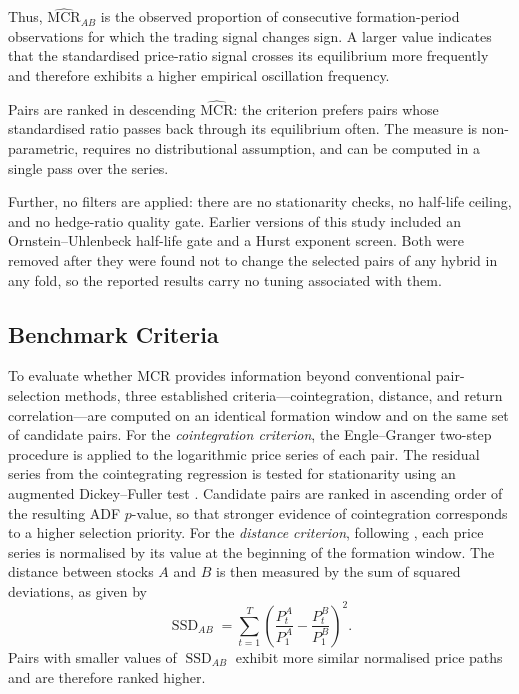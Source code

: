 \documentclass[11pt,a4paper]{article}
\theoremstyle{definition}
\newcommand{\MCR}{\ensuremath{\mathrm{MCR}}}
\begin{document}
Thus, $\widehat{\mathrm{MCR}}_{AB}$ is the observed proportion of
consecutive formation-period observations for which the trading signal
changes sign. A larger value indicates that the standardised price-ratio
signal crosses its equilibrium more frequently and therefore exhibits a
higher empirical oscillation frequency.


Pairs are ranked in descending $\widehat{\MCR}$: the criterion prefers pairs
whose standardised ratio passes back through its equilibrium often. The measure
is non-parametric, requires no distributional assumption, and can be computed in a single pass over the series.

Further, no filters are applied: there are no stationarity checks, no half-life
ceiling, and no hedge-ratio quality gate. Earlier versions of this study included
an Ornstein--Uhlenbeck half-life gate and a Hurst exponent screen. Both were
removed after they were found not to change the selected pairs of any hybrid in
any fold, so the reported results carry no tuning associated with them.

\subsection{Benchmark Criteria}

To evaluate whether MCR provides information beyond conventional pair-selection methods, three established criteria---cointegration, distance, and return correlation---are computed on an identical formation window and on the same set of candidate pairs. For the \emph{cointegration criterion}, the Engle--Granger two-step procedure \citep{engle1987, vidyamurthy2004} is applied to the logarithmic price series of each pair. The residual series from the cointegrating regression is tested for stationarity using an augmented Dickey--Fuller test \citep{dickey1979}. Candidate pairs are ranked in ascending order of the resulting ADF $p$-value, so that stronger evidence of cointegration corresponds to a higher selection priority. For the \emph{distance criterion}, following \citet{gatev2006}, each price series is normalised by its value at the beginning of the formation window. The distance between stocks $A$ and $B$ is then measured by the sum of squared deviations, as given by
\begin{equation} \operatorname{SSD}_{AB} = \sum_{t=1}^{T} \left( \frac{P_t^A}{P_1^A} - \frac{P_t^B}{P_1^B} \right)^2.
\label{eq:ssd}
\end{equation}
Pairs with smaller values of $\operatorname{SSD}_{AB}$ exhibit more similar normalised price paths and are therefore ranked higher.
\end{document}
